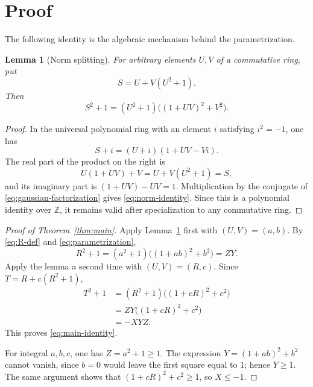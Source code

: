 \documentclass[11pt]{article}
\newtheorem{lemma}[theorem]{Lemma}
\theoremstyle{remark}
\newcommand{\Z}{\mathbb Z}
\begin{document}
\section{Proof}

The following identity is the algebraic mechanism behind the
parametrization.

\begin{lemma}[Norm splitting]\label{lem:norm-splitting}
For arbitrary elements $U,V$ of a commutative ring, put
\[
S=U+V(U^2+1).
\]
Then
\begin{equation}\label{eq:norm-identity}
S^2+1=(U^2+1)\bigl((1+UV)^2+V^2\bigr).
\end{equation}
\end{lemma}

\begin{proof}
In the universal polynomial ring with an element $i$ satisfying
$i^2=-1$, one has
\begin{equation}\label{eq:gaussian-factorization}
S+i=(U+i)(1+UV-Vi).
\end{equation}
The real part of the product on the right is
\[
U(1+UV)+V=U+V(U^2+1)=S,
\]
and its imaginary part is $(1+UV)-UV=1$.  Multiplication by the
conjugate of \eqref{eq:gaussian-factorization} gives
\eqref{eq:norm-identity}.  Since this is a polynomial identity over
$\Z$, it remains valid after specialization to any commutative ring.
\end{proof}

\begin{proof}[Proof of Theorem~\ref{thm:main}]
Apply Lemma~\ref{lem:norm-splitting} first with $(U,V)=(a,b)$.  By
\eqref{eq:R-def} and \eqref{eq:parametrization},
\begin{equation}\label{eq:first-splitting}
R^2+1=(a^2+1)\bigl((1+ab)^2+b^2\bigr)=ZY.
\end{equation}
Apply the lemma a second time with $(U,V)=(R,c)$.  Since
$T=R+c(R^2+1)$,
\begin{align*}
T^2+1
  &=(R^2+1)\bigl((1+cR)^2+c^2\bigr)\\
  &=ZY\bigl((1+cR)^2+c^2\bigr)\\
  &=-XYZ.
\end{align*}
This proves \eqref{eq:main-identity}.

For integral $a,b,c$, one has $Z=a^2+1\geq1$.  The expression
$Y=(1+ab)^2+b^2$ cannot vanish, since $b=0$ would leave the first
square equal to $1$; hence $Y\geq1$.  The same argument shows that
$(1+cR)^2+c^2\geq1$, so $X\leq-1$.
\end{proof}
\end{document}
